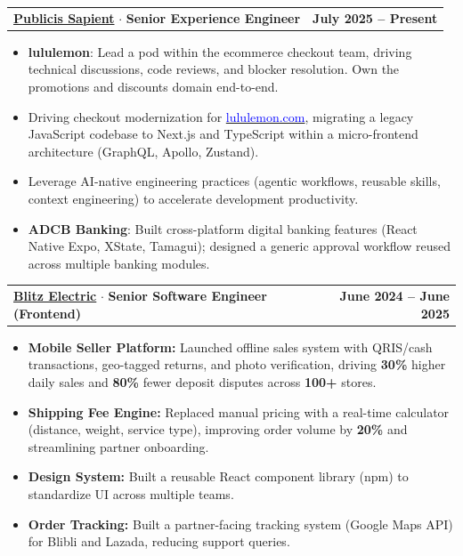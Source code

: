 \documentclass[a4paper,11pt]{article}
\makeatletter
\newcommand{\resumeExp}[4]{
\vspace{0mm}\item[]
    \begin{tabular*}{\textwidth}[t]{l@{\extracolsep{\fill}}r}
        \hspace{-4.4mm} \small\textbf{\textcolor{blue}{#1}} $\cdot$ \small{\textbf{#2}} & {\footnotesize{#3}}
    \end{tabular*}
    \vspace{-8mm}
}
\newcommand{\resumeItemListStart}{\begin{justify}\begin{itemize}[leftmargin=3ex, rightmargin=2ex, noitemsep,labelsep=1.2mm,itemsep=0mm]\small}
\newcommand{\resumeItemListEnd}{\end{itemize}\end{justify}\vspace{-1.5mm}}
\makeatother
\begin{document}
\resumeExp
{\href{https://www.publicissapient.com/}{Publicis Sapient}}
{Senior Experience Engineer}
{\textbf{July 2025 – Present}}
{\textbf{Mumbai, India (Hybrid)}}
\resumeItemListStart
\item[$\cdot$] \textbf{lululemon}: Lead a pod within the ecommerce checkout team, driving technical discussions, code reviews, and blocker resolution. Own the promotions and discounts domain end-to-end.
\item[$\cdot$] Driving checkout modernization for \href{https://shop.lululemon.com/}{\textcolor{blue}{lululemon.com}}, migrating a legacy JavaScript codebase to Next.js and TypeScript within a micro-frontend architecture (GraphQL, Apollo, Zustand).
\item[$\cdot$] Leverage AI-native engineering practices (agentic workflows, reusable skills, context engineering) to accelerate development productivity.
\item[$\cdot$] \textbf{ADCB Banking}: Built cross-platform digital banking features (React Native Expo, XState, Tamagui); designed a generic approval workflow reused across multiple banking modules.
\resumeItemListEnd

\vspace{2mm}
\resumeExp
{\href{https://www.blitzelectric.id/}{Blitz Electric}}
{Senior Software Engineer (Frontend)}
{\textbf{June 2024 – June 2025}}
{\textbf{Remote, Indonesia}}
\resumeItemListStart
\item[$\cdot$] \textbf{Mobile Seller Platform:} Launched offline sales system with QRIS/cash transactions, geo-tagged returns, and photo verification, driving \textbf{30\%} higher daily sales and \textbf{80\%} fewer deposit disputes across \textbf{100+} stores.
\item[$\cdot$] \textbf{Shipping Fee Engine:} Replaced manual pricing with a real-time calculator (distance, weight, service type), improving order volume by \textbf{20\%} and streamlining partner onboarding.
\item[$\cdot$] \textbf{Design System:} Built a reusable React component library (npm) to standardize UI across multiple teams.
\item[$\cdot$] \textbf{Order Tracking:} Built a partner-facing tracking system (Google Maps API) for Blibli and Lazada, reducing support queries.
\resumeItemListEnd
\end{document}
